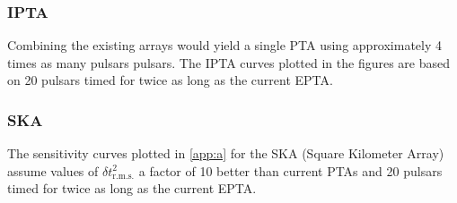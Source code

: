 \subsubsection{IPTA}
Combining the existing arrays would yield a single PTA using approximately 4 times as many pulsars pulsars. The IPTA curves plotted in the figures are based on 20 pulsars timed for twice as long as the current EPTA.

\subsubsection{SKA}
The sensitivity curves plotted in \ref{app:a} for the SKA (Square Kilometer Array) assume values of $\delta t^{2}_{\textrm{r.m.s.}}$ a factor of 10 better than current PTAs and 20 pulsars timed for twice as long as the current EPTA.

